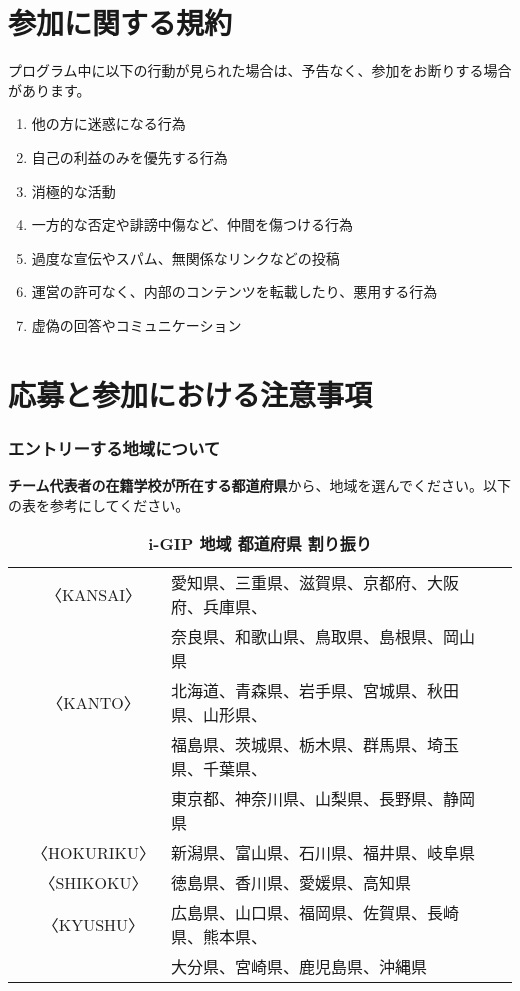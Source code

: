 \documentclass[10.5pt]{jsarticle}
\renewcommand{\thesection}{\arabic{section}.}
\begin{document}
\clearpage

\part*{参加に関する規約} 
プログラム中に以下の行動が見られた場合は、予告なく、参加をお断りする場合があります。
\begin{enumerate}[\ \ \bf 1. \ ]
\item 他の方に迷惑になる行為
\item 自己の利益のみを優先する行為
\item 消極的な活動
\item 一方的な否定や誹謗中傷など、仲間を傷つける行為
\item 過度な宣伝やスパム、無関係なリンクなどの投稿
\item 運営の許可なく、内部のコンテンツを転載したり、悪用する行為
\item 虚偽の回答やコミュニケーション
\end{enumerate}
\vspace{3mm}

\part*{応募と参加における注意事項}
\setcounter{section}{0}
\renewcommand{\thesection}{\Roman{section}.}

\section{エントリーする地域について}
{\bf チーム代表者の在籍学校が所在する都道府県}から、地域を選んでください。以下の表を参考にしてください。
\vspace{-5pt} \par
\begin{table}[h]
 \caption*{\bf i-GIP 地域 都道府県 割り振り}
 \centering
\begin{tabular}{rcll}
\hline\hline
&〈KANSAI〉	& 愛知県、三重県、滋賀県、京都府、大阪府、兵庫県、&\\
&			& 奈良県、和歌山県、鳥取県、島根県、岡山県&\\
\hline
&〈KANTO〉	& 北海道、青森県、岩手県、宮城県、秋田県、山形県、&\\
&			& 福島県、茨城県、栃木県、群馬県、埼玉県、千葉県、&\\
&			& 東京都、神奈川県、山梨県、長野県、静岡県 &\\
		\hline
&〈HOKURIKU〉& 新潟県、富山県、石川県、福井県、岐阜県 &\\
\hline
&〈SHIKOKU〉	& 徳島県、香川県、愛媛県、高知県&\\
\hline
&〈KYUSHU〉	& 広島県、山口県、福岡県、佐賀県、長崎県、熊本県、&\\
&			& 大分県、宮崎県、鹿児島県、沖縄県&\\
\hline\hline
\end{tabular}
\end{table}
\vspace{-5pt} \par
\end{document}
